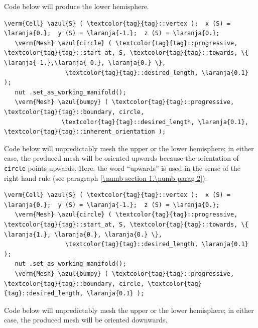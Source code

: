 Code below will produce the lower hemisphere.

\begin{Verbatim}[commandchars=\\\{\},formatcom=\small\tt,
   baselinestretch=0.94,framesep=2mm                      ]
   \verm{Cell} \azul{S} ( \textcolor{tag}{tag}::vertex );  x (S) = \laranja{0.};  y (S) = \laranja{-1.};  z (S) = \laranja{0.};
   \verm{Mesh} \azul{circle} ( \textcolor{tag}{tag}::progressive, \textcolor{tag}{tag}::start_at, S, \textcolor{tag}{tag}::towards, \{ \laranja{-1.},\laranja{ 0.}, \laranja{0.} \},
                 \textcolor{tag}{tag}::desired_length, \laranja{0.1}                                          );
   nut .set_as_working_manifold();
   \verm{Mesh} \azul{bumpy} ( \textcolor{tag}{tag}::progressive, \textcolor{tag}{tag}::boundary, circle,
                \textcolor{tag}{tag}::desired_length, \laranja{0.1}, \textcolor{tag}{tag}::inherent_orientation );
\end{Verbatim}

Code below will unpredictably mesh the upper or the lower hemisphere;
in either case, the produced mesh will be oriented upwards because the orientation
of {\small\tt circle} points upwards.
Here, the word ``upwards'' is used in the sense of the right hand rule
(see paragraph \ref{\numb section 1.\numb parag 2}).

\begin{Verbatim}[commandchars=\\\{\},formatcom=\small\tt,
   baselinestretch=0.94,framesep=2mm                     ]
   \verm{Cell} \azul{S} ( \textcolor{tag}{tag}::vertex );  x (S) = \laranja{0.};  y (S) = \laranja{-1.};  z (S) = \laranja{0.};
   \verm{Mesh} \azul{circle} ( \textcolor{tag}{tag}::progressive, \textcolor{tag}{tag}::start_at, S, \textcolor{tag}{tag}::towards, \{ \laranja{1.}, \laranja{0.}, \laranja{0.} \},
                 \textcolor{tag}{tag}::desired_length, \laranja{0.1}                                         );
   nut .set_as_working_manifold();
   \verm{Mesh} \azul{bumpy} ( \textcolor{tag}{tag}::progressive, \textcolor{tag}{tag}::boundary, circle, \textcolor{tag}{tag}::desired_length, \laranja{0.1} );
\end{Verbatim}

Code below will unpredictably mesh the upper or the lower hemisphere;
in either case, the produced mesh will be oriented downwards.


